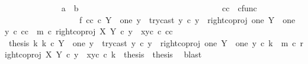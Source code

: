 \begin{isabellebody}
\ \ \ \ \ \ \ \ \ \ \ \ \isamarkupfalse%
\ {\isachardoublequoteopen}a\ {\isacharequal}{\kern0pt}\ b{\isachardoublequoteclose}\isanewline
\ \ \ \ \ \ \ \ \ \ \ \ \ \ \isamarkupfalse%
\ {\isacharminus}{\kern0pt}\isanewline
\ \ \ \ \ \ \ \ \ \ \ \ \ \ \ \ \isamarkupfalse%
\ cc\ {\isacharcolon}{\kern0pt}{\isacharcolon}{\kern0pt}\ cfunc\ \isanewline
\ \ \ \ \ \ \ \ \ \ \ \ \ \ \ \ \ \ f{}{\isacharcolon}{\kern0pt}\ {\isachardoublequoteopen}cc\ {\isasymin}\isactrlsub c\ Y\ {\isasymsetminus}\ {\isacharparenleft}{\kern0pt}one{\isacharcomma}{\kern0pt}\ y{}{\isacharparenright}{\kern0pt}\ {\isasymand}\ try{\isacharunderscore}{\kern0pt}cast\ y{}\ {\isasymcirc}\isactrlsub c\ y\ {\isacharequal}{\kern0pt}\ right{\isacharunderscore}{\kern0pt}coproj\ one\ {\isacharparenleft}{\kern0pt}Y\ {\isasymsetminus}\ {\isacharparenleft}{\kern0pt}one{\isacharcomma}{\kern0pt}\ y{}{\isacharparenright}{\kern0pt}{\isacharparenright}{\kern0pt}\ {\isasymcirc}\isactrlsub c\ cc\ {\isasymand}\ m\ {\isasymcirc}\isactrlsub c\ right{\isacharunderscore}{\kern0pt}coproj\ X\ Y\ {\isasymcirc}\isactrlsub c\ y\ {\isacharequal}{\kern0pt}\ {\isasymlangle}x{}{\isacharcomma}{\kern0pt}y{}\isactrlsup c\ {\isasymcirc}\isactrlsub c\ cc{\isasymrangle}{\isachardoublequoteclose}\isanewline
\ \ \ \ \ \ \ \ \ \ \ \ \ \ \ \ \ \ \isamarkupfalse%
\ {\isacartoucheopen}{\isasymAnd}thesis{\isachardot}{\kern0pt}\ {\isacharparenleft}{\kern0pt}{\isasymAnd}k{\isachardot}{\kern0pt}\ k\ {\isasymin}\isactrlsub c\ Y\ {\isasymsetminus}\ {\isacharparenleft}{\kern0pt}one{\isacharcomma}{\kern0pt}\ y{}{\isacharparenright}{\kern0pt}\ {\isasymand}\ try{\isacharunderscore}{\kern0pt}cast\ y{}\ {\isasymcirc}\isactrlsub c\ y\ {\isacharequal}{\kern0pt}\ right{\isacharunderscore}{\kern0pt}coproj\ one\ {\isacharparenleft}{\kern0pt}Y\ {\isasymsetminus}\ {\isacharparenleft}{\kern0pt}one{\isacharcomma}{\kern0pt}\ y{}{\isacharparenright}{\kern0pt}{\isacharparenright}{\kern0pt}\ {\isasymcirc}\isactrlsub c\ k\ {\isasymand}\ m\ {\isasymcirc}\isactrlsub c\ right{\isacharunderscore}{\kern0pt}coproj\ X\ Y\ {\isasymcirc}\isactrlsub c\ y\ {\isacharequal}{\kern0pt}\ {\isasymlangle}x{}{\isacharcomma}{\kern0pt}y{}\isactrlsup c\ {\isasymcirc}\isactrlsub c\ k{\isasymrangle}\ {\isasymLongrightarrow}\ thesis{\isacharparenright}{\kern0pt}\ {\isasymLongrightarrow}\ thesis{\isacartoucheclose}\ \isamarkupfalse%
\ blast\isanewline
\ \ \ \ \ \ \ \ \ \ \ \ \ \ \ \ \isamarkupfalse%

\end{isabellebody}
